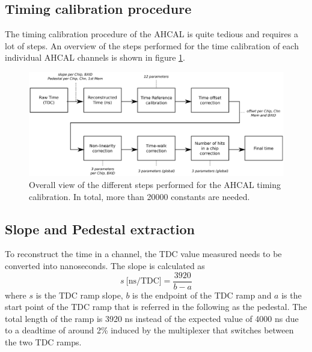 \documentclass{JINST}
\begin{document}
\subsection{Timing calibration procedure}

The timing calibration procedure of the AHCAL is quite tedious and requires a lot of steps. An overview of the steps performed for the time calibration of each individual AHCAL channels is shown in figure \ref{fig:CalibOverview}.

\begin{figure}[htbp!]
  \centering
  \includegraphics[width=1\linewidth]{fig/TimeCalibOverview.eps}
  \caption{Overall view of the different steps performed for the AHCAL timing calibration. In total, more than 20000 constants are needed.} \label{fig:CalibOverview}
\end{figure}

\subsection{Slope and Pedestal extraction}

To reconstruct the time in a channel, the TDC value measured needs to be converted into nanoseconds. The slope is calculated as
\begin{equation} \label{eq:slope}
  s \: \text{[ns/TDC]} = \frac{3920}{b - a}
\end{equation}
where $s$ is the TDC ramp slope, $b$ is the endpoint of the TDC ramp and $a$ is the start point of the TDC ramp that is referred in the following as the pedestal. The total length of the ramp is 3920 ns instead of the expected value of 4000 ns due to a deadtime of around 2\% \cite{Brianne2012} induced by the multiplexer that switches between the two TDC ramps.
\end{document}
